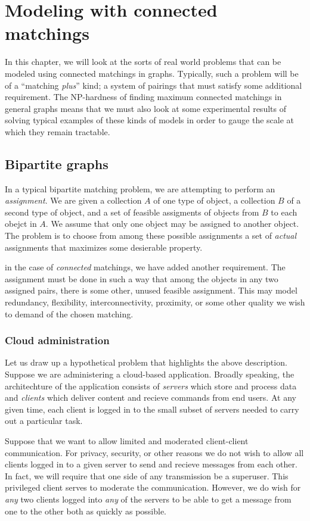 \chapter{Modeling with connected matchings}

In this chapter, we will look at the sorts of real world problems that can be modeled using connected matchings in graphs.  Typically, such a problem will be of a ``matching {\it plus}'' kind; a system of pairings that must satisfy some additional requirement.  The NP-hardness of finding maximum connected matchings in general graphs means that we must also look at some experimental results of solving typical examples of these kinds of models in order to gauge the scale at which they remain tractable.
    
	
\section{Bipartite graphs}
	In a typical bipartite matching problem, we are attempting to perform an {\it assignment}.  We are given a collection $A$ of one type of object, a collection $B$ of a second type of object, and a set of feasible assigments
of objects from $B$ to each obejct in $A$.  We assume that only one object may be assigned to another object.  The problem is to choose from among these possible assignments a set of {\it actual} assignments that maximizes some desierable property.
	
	in the case of {\it connected} matchings, we have added another requirement.  The assignment must be done in such a way that among the objects in any two assigned pairs, there is some other, unused feasible assignment.  This may model redundancy, flexibility, interconnectivity, proximity, or some other quality we wish to demand of the chosen matching.   
	\subsection{Cloud administration}

	Let us draw up a hypothetical problem that highlights the above description.  Suppose we are administering a cloud-based application. Broadly speaking, the architechture of the application consists of {\it servers} which store and process data and {\it clients} which deliver content and recieve commands from end users.  At any given time, each client is logged in to the small subset of servers needed to carry out a particular task.

Suppose that we want to allow limited and moderated client-client communication.  For privacy, security, or other reasons we do not wish to allow all clients logged in to a given server to send and recieve messages from each other.  In fact, we will require that one side of any transmission be a superuser.   This privileged client serves to moderate the communication.  However, we do wish for {\it any} two clients logged into {\it any} of the servers to be able to get a message from one to the other both as quickly as possible. 

